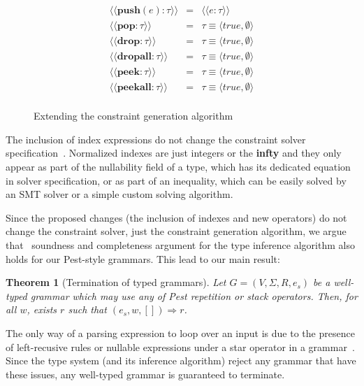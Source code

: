 \documentclass[sigplan,screen]{acmart}
\newtheorem{Theorem}{Theorem}
\theoremstyle{definition}
\begin{document}
\begin{figure}[H]
  \[
    \begin{array}{lcl}
      \langle\langle \mathbf{push}(e) : \tau\rangle\rangle & = & \langle\langle e : \tau \rangle\rangle \\
      \langle\langle \mathbf{pop} : \tau \rangle\rangle & = & \tau \equiv \langle true, \emptyset \rangle\\
      \langle\langle \mathbf{drop} : \tau \rangle\rangle & = & \tau \equiv \langle true, \emptyset \rangle\\
      \langle\langle \mathbf{dropall} : \tau \rangle\rangle & = & \tau \equiv \langle true, \emptyset \rangle\\
      \langle\langle \mathbf{peek} : \tau \rangle\rangle & = & \tau \equiv \langle true, \emptyset \rangle\\
      \langle\langle \mathbf{peekall} : \tau \rangle\rangle & = & \tau \equiv \langle true, \emptyset \rangle\\
    \end{array}
  \]
  \caption{Extending the constraint generation algorithm}
  \label{fig:constraint-gen}
\end{figure}

The inclusion of index expressions do not change the constraint solver specification~\cite{Cardoso23}.
Normalized indexes are just integers or the \textbf{infty} and they only appear as part of the
nullability field of a type, which has its dedicated equation in solver specification, or as part
of an inequality, which can be easily solved by an SMT solver or a simple custom solving algorithm.

Since the proposed changes (the inclusion of indexes and new operators) do not change the
constraint solver, just the constraint generation algorithm, we argue that~\citet{Cardoso23}
soundness and completeness argument for the type inference algorithm
also holds for our Pest-style grammars. This lead to our main result:

\begin{Theorem}[Termination of typed grammars]
  Let $G = (V,\Sigma,R, e_s)$ be a well-typed grammar which may use any of Pest
  repetition or stack operators. Then, for all $w$, exists $r$
  such that $(e_s,w,[])\Rightarrow r$.
\end{Theorem}

The only way of a parsing expression to loop over an input is due to
the presence of left-recusive rules or nullable expressions
under a star operator in a grammar~\cite{Ford2004}. Since the type system (and its
inference algorithm) reject any grammar that have these issues,
any well-typed grammar is guaranteed to terminate.
\end{document}
